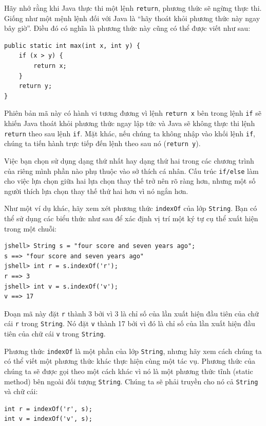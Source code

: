Hãy nhớ rằng khi Java thực thi một lệnh \texttt{return}, phương thức sẽ
ngừng thực thi. Giống như một mệnh lệnh đối với Java là ``hãy thoát khỏi
phương thức này ngay bây giờ''. Điều đó có nghĩa là phương thức này cũng
có thể được viết như sau:

\begin{verbatim}
public static int max(int x, int y) {
    if (x > y) {
        return x;
    }
    return y; 
}
\end{verbatim}

Phiên bản mã này có hành vi tương đương vì lệnh \texttt{return\ x} bên
trong lệnh \texttt{if} sẽ khiến Java thoát khỏi phương thức ngay lập tức
và Java sẽ không thực thi lệnh \texttt{return} theo sau lệnh
\texttt{if}. Mặt khác, nếu chúng ta không nhập vào khối lệnh
\texttt{if}, chúng ta tiến hành trực tiếp đến lệnh theo sau nó
(\texttt{return\ y}).

Việc bạn chọn sử dụng dạng thứ nhất hay dạng thứ hai trong các chương
trình của riêng mình phần nào phụ thuộc vào sở thích cá nhân. Cấu trúc
\texttt{if/else} làm cho việc lựa chọn giữa hai lựa chọn thay thế trở
nên rõ ràng hơn, nhưng một số người thích lựa chọn thay thế thứ hai hơn
vì nó ngắn hơn.

Như một ví dụ khác, hãy xem xét phương thức \texttt{indexOf} của lớp
\texttt{String}. Bạn có thể sử dụng các biểu thức như sau để xác định vị
trí một ký tự cụ thể xuất hiện trong một chuỗi:

\begin{verbatim}
jshell> String s = "four score and seven years ago"; 
s ==> "four score and seven years ago"
jshell> int r = s.indexOf('r'); 
r ==> 3
jshell> int v = s.indexOf('v'); 
v ==> 17
\end{verbatim}

Đoạn mã này đặt \texttt{r} thành 3 bởi vì 3 là chỉ số của lần xuất hiện
đầu tiên của chữ cái \texttt{\textquotesingle{}r\textquotesingle{}}
trong \texttt{String}. Nó đặt \texttt{v} thành 17 bởi vì đó là chỉ số
của lần xuất hiện đầu tiên của chữ cái
\texttt{\textquotesingle{}v\textquotesingle{}} trong \texttt{String}.

Phương thức \texttt{indexOf} là một phần của lớp \texttt{String}, nhưng
hãy xem cách chúng ta có thể viết một phương thức khác thực hiện cùng
một tác vụ. Phương thức của chúng ta sẽ được gọi theo một cách khác vì
nó là một phương thức tĩnh (static method) bên ngoài đối tượng
\texttt{String}. Chúng ta sẽ phải truyền cho nó cả \texttt{String} và
chữ cái:

\begin{verbatim}
int r = indexOf('r', s);
int v = indexOf('v', s);
\end{verbatim}

